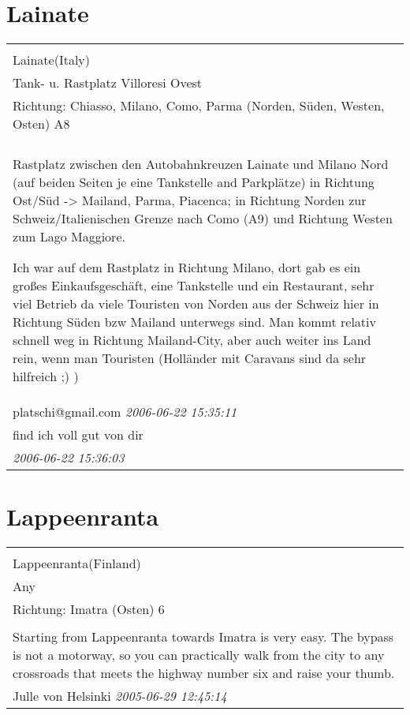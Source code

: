\documentclass[a4paper,12pt]{article}
\begin{document}
\section{Lainate}
\begin{tabular}{|p{13cm}|}
\hline\\
Lainate(Italy)\\
Tank- u. Rastplatz Villoresi Ovest\\
Richtung: Chiasso, Milano, Como, Parma (Norden, Süden, Westen, Osten) A8 \\
\hline\\
Rastplatz zwischen den Autobahnkreuzen Lainate und Milano Nord (auf beiden Seiten je eine Tankstelle and Parkplätze) in Richtung Ost/Süd -> Mailand, Parma, Piacenca; in Richtung Norden zur Schweiz/Italienischen Grenze nach Como (A9) und Richtung Westen zum Lago Maggiore.

Ich war auf dem Rastplatz in Richtung Milano, dort gab es ein großes Einkaufsgeschäft, eine Tankstelle und ein Restaurant, sehr viel Betrieb da viele Touristen von Norden aus der Schweiz hier in Richtung Süden bzw Mailand unterwegs sind. Man kommt relativ schnell weg in Richtung Mailand-City, aber auch weiter ins Land rein, wenn man Touristen (Holländer mit Caravans sind da sehr hilfreich ;) ) \\
platschi@gmail.com \textit{ 2006-06-22 15:35:11 }\\\hline find ich voll gut von dir \\
\textit{ 2006-06-22 15:36:03 }\\\hline
\end{tabular}


\section{Lappeenranta}
\begin{tabular}{|p{13cm}|}
\hline\\
Lappeenranta(Finland)\\
Any\\
Richtung: Imatra (Osten) 6 \\
\hline\\
Starting from Lappeenranta towards Imatra is very easy. The bypass is not a motorway, so you can practically walk from the city to any crossroads that meets the highway number six and raise your thumb. \\
Julle von Helsinki \textit{ 2005-06-29 12:45:14 }\\\hline
\end{tabular}
\end{document}
